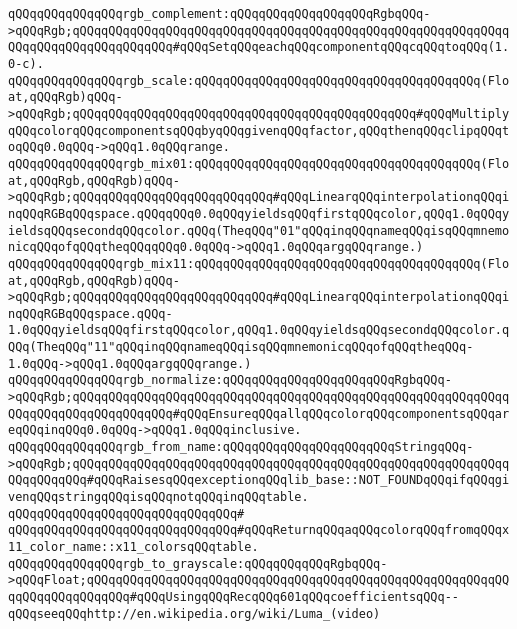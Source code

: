 \newline
\verb|qQQqqQQqqQQqqQQqrgb_complement:qQQqqQQqqQQqqQQqqQQqRgbqQQq->qQQqRgb;qQQqqQQqqQQqqQQqqQQqqQQqqQQqqQQqqQQqqQQqqQQqqQQqqQQqqQQqqQQqqQQqqQQqqQQqqQQqqQQqqQQq#qQQqSetqQQqeachqQQqcomponentqQQqcqQQqtoqQQq(1.0-c).|\newline
\newline
\verb|qQQqqQQqqQQqqQQqrgb_scale:qQQqqQQqqQQqqQQqqQQqqQQqqQQqqQQqqQQqqQQq(Float,qQQqRgb)qQQq->qQQqRgb;qQQqqQQqqQQqqQQqqQQqqQQqqQQqqQQqqQQqqQQqqQQqqQQq#qQQqMultiplyqQQqcolorqQQqcomponentsqQQqbyqQQqgivenqQQqfactor,qQQqthenqQQqclipqQQqtoqQQq0.0qQQq->qQQq1.0qQQqrange.|\newline
\newline
\verb|qQQqqQQqqQQqqQQqrgb_mix01:qQQqqQQqqQQqqQQqqQQqqQQqqQQqqQQqqQQqqQQq(Float,qQQqRgb,qQQqRgb)qQQq->qQQqRgb;qQQqqQQqqQQqqQQqqQQqqQQqqQQq#qQQqLinearqQQqinterpolationqQQqinqQQqRGBqQQqspace.qQQqqQQq0.0qQQqyieldsqQQqfirstqQQqcolor,qQQq1.0qQQqyieldsqQQqsecondqQQqcolor.qQQq(TheqQQq"01"qQQqinqQQqnameqQQqisqQQqmnemonicqQQqofqQQqtheqQQqqQQq0.0qQQq->qQQq1.0qQQqargqQQqrange.)|\newline
\verb|qQQqqQQqqQQqqQQqrgb_mix11:qQQqqQQqqQQqqQQqqQQqqQQqqQQqqQQqqQQqqQQq(Float,qQQqRgb,qQQqRgb)qQQq->qQQqRgb;qQQqqQQqqQQqqQQqqQQqqQQqqQQq#qQQqLinearqQQqinterpolationqQQqinqQQqRGBqQQqspace.qQQq-1.0qQQqyieldsqQQqfirstqQQqcolor,qQQq1.0qQQqyieldsqQQqsecondqQQqcolor.qQQq(TheqQQq"11"qQQqinqQQqnameqQQqisqQQqmnemonicqQQqofqQQqtheqQQq-1.0qQQq->qQQq1.0qQQqargqQQqrange.)|\newline
\newline
\verb|qQQqqQQqqQQqqQQqrgb_normalize:qQQqqQQqqQQqqQQqqQQqqQQqRgbqQQq->qQQqRgb;qQQqqQQqqQQqqQQqqQQqqQQqqQQqqQQqqQQqqQQqqQQqqQQqqQQqqQQqqQQqqQQqqQQqqQQqqQQqqQQqqQQq#qQQqEnsureqQQqallqQQqcolorqQQqcomponentsqQQqareqQQqinqQQq0.0qQQq->qQQq1.0qQQqinclusive.|\newline
\newline
\verb|qQQqqQQqqQQqqQQqrgb_from_name:qQQqqQQqqQQqqQQqqQQqqQQqStringqQQq->qQQqRgb;qQQqqQQqqQQqqQQqqQQqqQQqqQQqqQQqqQQqqQQqqQQqqQQqqQQqqQQqqQQqqQQqqQQqqQQq#qQQqRaisesqQQqexceptionqQQqlib_base::NOT_FOUNDqQQqifqQQqgivenqQQqstringqQQqisqQQqnotqQQqinqQQqtable.|\newline
\verb|qQQqqQQqqQQqqQQqqQQqqQQqqQQqqQQq#|\newline
\verb|qQQqqQQqqQQqqQQqqQQqqQQqqQQqqQQq#qQQqReturnqQQqaqQQqcolorqQQqfromqQQqx11_color_name::x11_colorsqQQqtable.|\newline
\newline
\verb|qQQqqQQqqQQqqQQqrgb_to_grayscale:qQQqqQQqqQQqRgbqQQq->qQQqFloat;qQQqqQQqqQQqqQQqqQQqqQQqqQQqqQQqqQQqqQQqqQQqqQQqqQQqqQQqqQQqqQQqqQQqqQQqqQQq#qQQqUsingqQQqRecqQQq601qQQqcoefficientsqQQq--qQQqseeqQQqhttp://en.wikipedia.org/wiki/Luma_(video)|\newline
